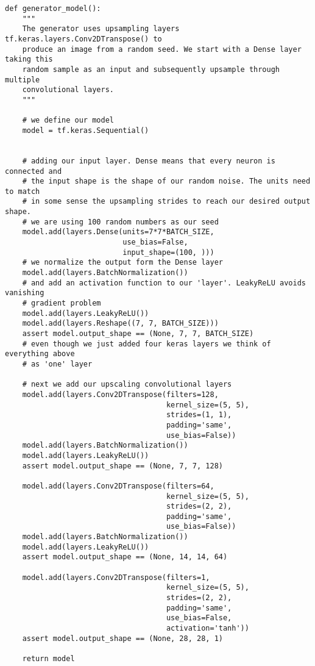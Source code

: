 \documentclass[%
oneside,                 %
final,                   %
10pt]{article}
\begin{document}
\begin{verbatim}
def generator_model():
    """
    The generator uses upsampling layers tf.keras.layers.Conv2DTranspose() to
    produce an image from a random seed. We start with a Dense layer taking this
    random sample as an input and subsequently upsample through multiple
    convolutional layers.
    """

    # we define our model
    model = tf.keras.Sequential()


    # adding our input layer. Dense means that every neuron is connected and
    # the input shape is the shape of our random noise. The units need to match
    # in some sense the upsampling strides to reach our desired output shape.
    # we are using 100 random numbers as our seed
    model.add(layers.Dense(units=7*7*BATCH_SIZE,
                           use_bias=False,
                           input_shape=(100, )))
    # we normalize the output form the Dense layer
    model.add(layers.BatchNormalization())
    # and add an activation function to our 'layer'. LeakyReLU avoids vanishing
    # gradient problem
    model.add(layers.LeakyReLU())
    model.add(layers.Reshape((7, 7, BATCH_SIZE)))
    assert model.output_shape == (None, 7, 7, BATCH_SIZE)
    # even though we just added four keras layers we think of everything above
    # as 'one' layer

    # next we add our upscaling convolutional layers
    model.add(layers.Conv2DTranspose(filters=128,
                                     kernel_size=(5, 5),
                                     strides=(1, 1),
                                     padding='same',
                                     use_bias=False))
    model.add(layers.BatchNormalization())
    model.add(layers.LeakyReLU())
    assert model.output_shape == (None, 7, 7, 128)

    model.add(layers.Conv2DTranspose(filters=64,
                                     kernel_size=(5, 5),
                                     strides=(2, 2),
                                     padding='same',
                                     use_bias=False))
    model.add(layers.BatchNormalization())
    model.add(layers.LeakyReLU())
    assert model.output_shape == (None, 14, 14, 64)

    model.add(layers.Conv2DTranspose(filters=1,
                                     kernel_size=(5, 5),
                                     strides=(2, 2),
                                     padding='same',
                                     use_bias=False,
                                     activation='tanh'))
    assert model.output_shape == (None, 28, 28, 1)

    return model


\end{verbatim}
\end{document}
